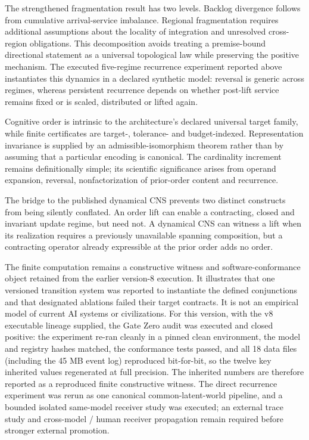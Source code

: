 The strengthened fragmentation result has two levels. Backlog divergence
follows from cumulative arrival-service imbalance. Regional
fragmentation requires additional assumptions about the locality of
integration and unresolved cross-region obligations. This decomposition
avoids treating a premise-bound directional statement as a universal
topological law while preserving the positive mechanism. The executed
five-regime recurrence experiment reported above instantiates this
dynamics in a declared synthetic model: reversal is generic across
regimes, whereas persistent recurrence depends on whether post-lift
service remains fixed or is scaled, distributed or lifted again.

Cognitive order is intrinsic to the architecture's declared universal
target family, while finite certificates are target-, tolerance- and
budget-indexed. Representation invariance is supplied by an
admissible-isomorphism theorem rather than by assuming that a particular
encoding is canonical. The cardinality increment remains definitionally
simple; its scientific significance arises from operand expansion,
reversal, nonfactorization of prior-order content and recurrence.

The bridge to the published dynamical CNS prevents two distinct
constructs from being silently conflated. An order lift can enable a
contracting, closed and invariant update regime, but need not. A
dynamical CNS can witness a lift when its realization requires a
previously unavailable spanning composition, but a contracting operator
already expressible at the prior order adds no order.

The finite computation remains a constructive witness and
software-conformance object retained from the earlier version-8
execution. It illustrates that one versioned transition system was
reported to instantiate the defined conjunctions and that designated
ablations failed their target contracts. It is not an empirical model of
current AI systems or civilizations. For this version, with the v8
executable lineage supplied, the Gate Zero audit was executed and closed
positive: the experiment re-ran cleanly in a pinned clean environment,
the model and registry hashes matched, the conformance tests passed, and
all 18 data files (including the 45 MB event log) reproduced
bit-for-bit, so the twelve key inherited values regenerated at full
precision. The inherited numbers are therefore reported as a reproduced
finite constructive witness. The direct recurrence experiment was rerun
as one canonical common-latent-world pipeline, and a bounded isolated
same-model receiver study was executed; an external trace study and
cross-model / human receiver propagation remain required before stronger
external promotion.

